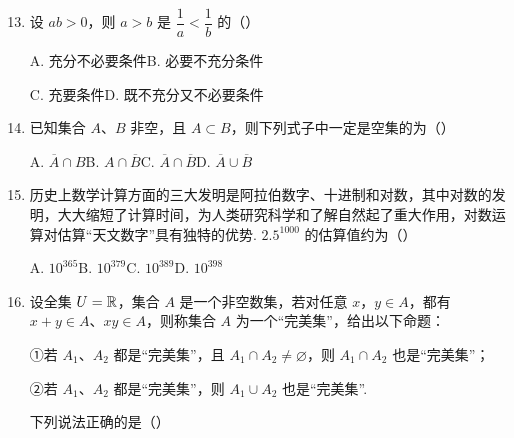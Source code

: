 \begin{enumerate}
\setcounter{enumi}{12}

\item 设 $ab>0$，则 $a>b$ 是 $\dfrac{1}{a}<\dfrac{1}{b}$ 的\mbox{（\quad）}

\keepwithprev
A. 充分不必要条件\qquad\qquad B. 必要不充分条件

C. 充要条件\qquad\qquad D. 既不充分又不必要条件

\ifanswer
{}
\fi

\item 已知集合 $A$、$B$ 非空，且 $A\subset B$，则下列式子中一定是空集的为\mbox{（\quad）}

\keepwithprev
A. $\overline{A}\cap B$\qquad B. $A\cap\overline{B}$\qquad C. $\overline{A}\cap\overline{B}$\qquad D. $\overline{A}\cup\overline{B}$

\ifanswer
\solbegin
{}
\solend
\fi

\item 历史上数学计算方面的三大发明是阿拉伯数字、十进制和对数，其中对数的发明，大大缩短了计算时间，为人类研究科学和了解自然起了重大作用，对数运算对估算“天文数字”具有独特的优势. $2.5^{1000}$ 的估算值约为\mbox{（\quad）}

\keepwithprev
A. $10^{365}$\qquad B. $10^{379}$\qquad C. $10^{389}$\qquad D. $10^{398}$

\ifanswer
\solbegin
{}
\solend
\fi

\item 设全集 $U=\mathbb{R}$，集合 $A$ 是一个非空数集，若对任意 $x$，$y\in A$，都有 $x+y\in A$、$xy\in A$，则称集合 $A$ 为一个“完美集”，给出以下命题：

①若 $A_1$、$A_2$ 都是“完美集”，且 $A_1\cap A_2\ne\varnothing$，则 $A_1\cap A_2$ 也是“完美集”；

②若 $A_1$、$A_2$ 都是“完美集”，则 $A_1\cup A_2$ 也是“完美集”.

下列说法正确的是\mbox{（\quad）}


\end{enumerate}
